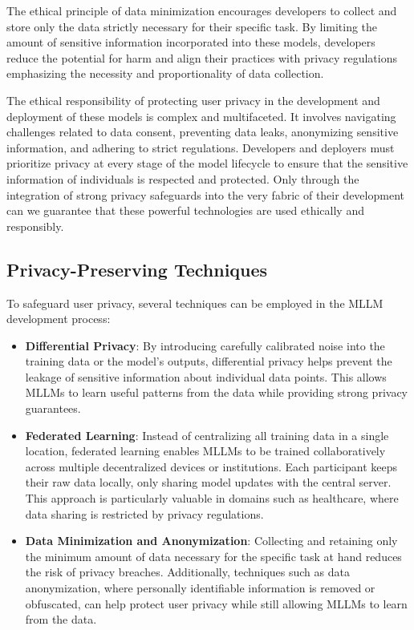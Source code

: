 The ethical principle of data minimization encourages developers to collect and store only the data strictly necessary for their specific task. By limiting the amount of sensitive information incorporated into these models, developers reduce the potential for harm and align their practices with privacy regulations emphasizing the necessity and proportionality of data collection.

The ethical responsibility of protecting user privacy in the development and deployment of these models is complex and multifaceted. It involves navigating challenges related to data consent, preventing data leaks, anonymizing sensitive information, and adhering to strict regulations. Developers and deployers must prioritize privacy at every stage of the model lifecycle to ensure that the sensitive information of individuals is respected and protected. Only through the integration of strong privacy safeguards into the very fabric of their development can we guarantee that these powerful technologies are used ethically and responsibly.

\subsection{Privacy-Preserving Techniques}

To safeguard user privacy, several techniques can be employed in the MLLM development process:

\begin{itemize}
    \item \textbf{Differential Privacy}: By introducing carefully calibrated noise into the training data or the model's outputs, differential privacy helps prevent the leakage of sensitive information about individual data points. This allows MLLMs to learn useful patterns from the data while providing strong privacy guarantees.
    
    \item \textbf{Federated Learning}: Instead of centralizing all training data in a single location, federated learning enables MLLMs to be trained collaboratively across multiple decentralized devices or institutions. Each participant keeps their raw data locally, only sharing model updates with the central server. This approach is particularly valuable in domains such as healthcare, where data sharing is restricted by privacy regulations.
    
    \item \textbf{Data Minimization and Anonymization}: Collecting and retaining only the minimum amount of data necessary for the specific task at hand reduces the risk of privacy breaches. Additionally, techniques such as data anonymization, where personally identifiable information is removed or obfuscated, can help protect user privacy while still allowing MLLMs to learn from the data.
\end{itemize}

